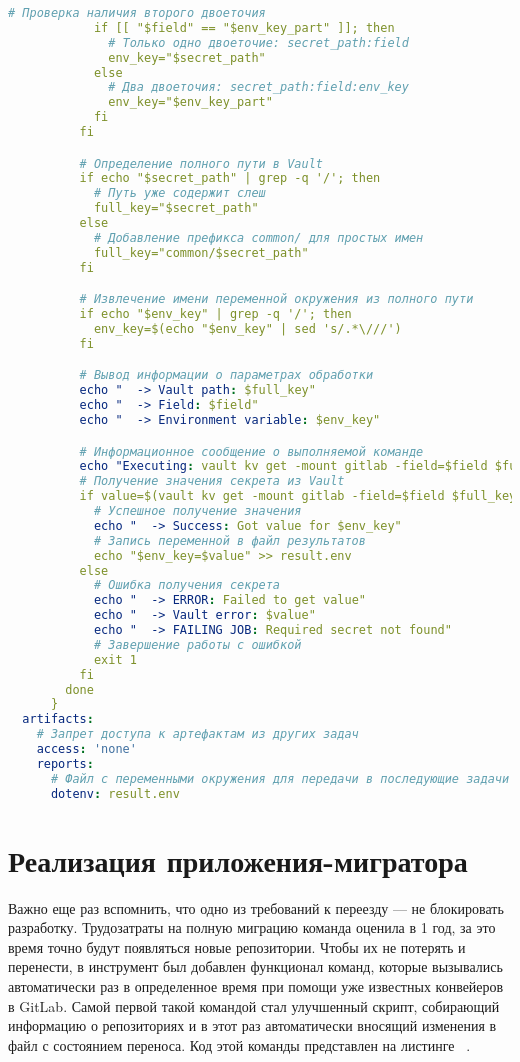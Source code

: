\begin{lstlisting}[language=yaml,label={lst:component-template},caption={Компонентный шаблон для load-vault-secret}]
            # Проверка наличия второго двоеточия
            if [[ "$field" == "$env_key_part" ]]; then
              # Только одно двоеточие: secret_path:field
              env_key="$secret_path"
            else
              # Два двоеточия: secret_path:field:env_key
              env_key="$env_key_part"
            fi
          fi

          # Определение полного пути в Vault
          if echo "$secret_path" | grep -q '/'; then
            # Путь уже содержит слеш
            full_key="$secret_path"
          else
            # Добавление префикса common/ для простых имен
            full_key="common/$secret_path"
          fi

          # Извлечение имени переменной окружения из полного пути
          if echo "$env_key" | grep -q '/'; then
            env_key=$(echo "$env_key" | sed 's/.*\///')
          fi

          # Вывод информации о параметрах обработки
          echo "  -> Vault path: $full_key"
          echo "  -> Field: $field"
          echo "  -> Environment variable: $env_key"

          # Информационное сообщение о выполняемой команде
          echo "Executing: vault kv get -mount gitlab -field=$field $full_key"
          # Получение значения секрета из Vault
          if value=$(vault kv get -mount gitlab -field=$field $full_key 2>&1); then
            # Успешное получение значения
            echo "  -> Success: Got value for $env_key"
            # Запись переменной в файл результатов
            echo "$env_key=$value" >> result.env
          else
            # Ошибка получения секрета
            echo "  -> ERROR: Failed to get value"
            echo "  -> Vault error: $value"
            echo "  -> FAILING JOB: Required secret not found"
            # Завершение работы с ошибкой
            exit 1
          fi
        done
      }
  artifacts:
    # Запрет доступа к артефактам из других задач
    access: 'none'
    reports:
      # Файл с переменными окружения для передачи в последующие задачи
      dotenv: result.env
\end{lstlisting}

\section{Реализация приложения-мигратора} \label{sec:migrator-impl}
Важно еще раз вспомнить, что одно из требований к переезду — не блокировать разработку.
Трудозатраты на полную миграцию команда оценила в 1 год, за это время точно будут появляться новые репозитории.
Чтобы их не потерять и перенести, в инструмент был добавлен функционал команд,
которые вызывались автоматически раз в определенное время при помощи уже известных конвейеров в GitLab.
Самой первой такой командой стал улучшенный скрипт, собирающий информацию о репозиториях и в этот раз автоматически вносящий изменения в файл с состоянием переноса.
Код этой команды представлен на листинге ~\cite{lst:update-migration-state-command}.

